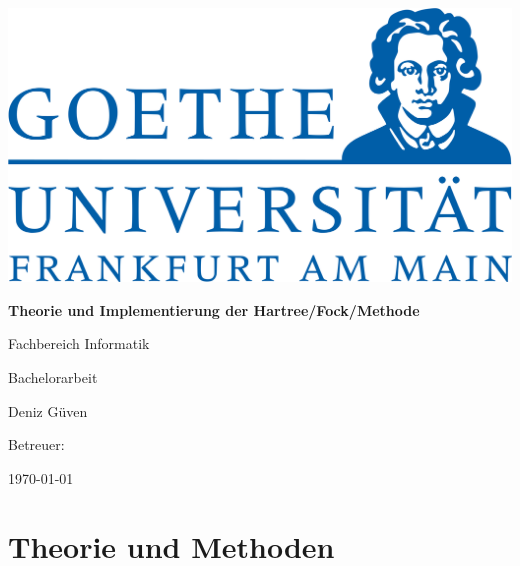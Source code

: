 \documentclass[a4paper, 12pt, ngerman]{report}
\author{Deniz Güven}
\begin{document}
\begin{titlepage}
  \begin{center}
    \includegraphics[width=0.5\linewidth]{res/uni.png}
    \vspace{2cm}

    \huge{\textbf{Theorie und Implementierung der Hartree\-/Fock\-/Methode}}
    \vspace{1cm}

    \Large
    Fachbereich Informatik

    Bachelorarbeit

    Deniz Güven
    \vfill

    Betreuer: 

    \today
  \end{center}
\end{titlepage}

\tableofcontents




\chapter{Theorie und Methoden}















\end{document}
